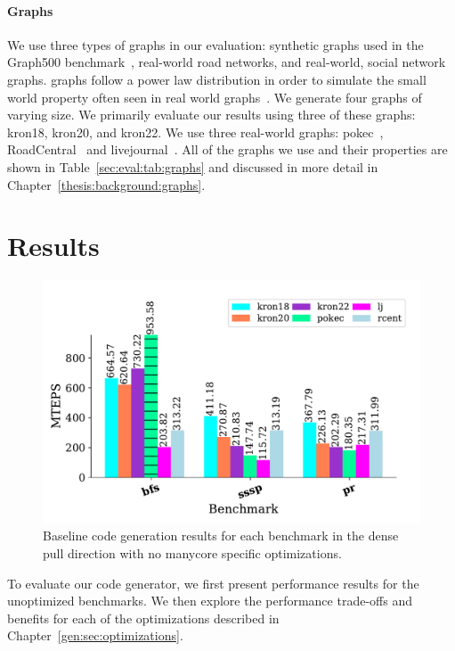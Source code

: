 \paragraph{Graphs} We use three types of graphs in our evaluation: synthetic \kron graphs used in the Graph500 benchmark~\cite{murphy2010graph500}, real-world road networks, and real-world, social network graphs.
\kron graphs follow a power law distribution in order to simulate the small world property often seen in real world graphs~\cite{leskovec2010kronecker}.
We generate four \kron graphs of varying size. 
We primarily evaluate our results using three of these graphs: kron18, kron20, and kron22.
We use three real-world graphs: pokec~\cite{pokec}, RoadCentral~\cite{davis2011university} and livejournal~\cite{lj}.
All of the graphs we use and their properties are shown in Table~\ref{sec:eval:tab:graphs} and discussed in more detail in Chapter~\ref{thesis:background:graphs}.


\section{Results}
\begin{figure}[h!]
    \centering
    \includegraphics[scale = 0.6]{graphit-figures/baseline.pdf}
    \caption{Baseline code generation results for each benchmark in the dense pull direction with no manycore specific optimizations.}
    \label{pap:generals:sec:eval:fig:baseline}
\end{figure}

To evaluate our code generator, we first present performance results for the unoptimized benchmarks. 
We then explore the performance trade-offs and benefits for each of the optimizations described in Chapter~\ref{gen:sec:optimizations}.

